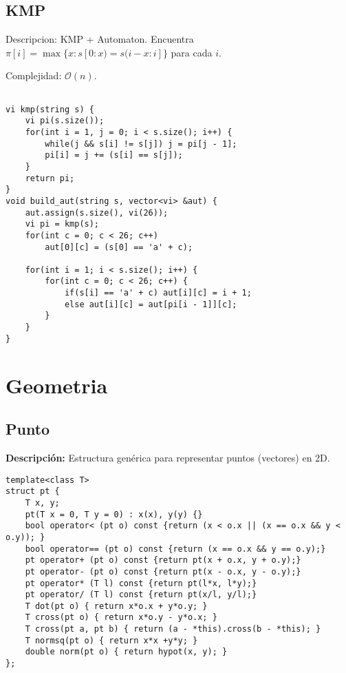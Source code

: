\documentclass[twocolumn]{article}
\begin{document}
\subsection{KMP}
\begin{footnotesize}Descripcion: KMP + Automaton. Encuentra $\pi[i] = \max \{x \colon s[0 : x) = s(i - x : i]\}$ para cada $i$.


Complejidad: $\mathcal{O}(n)$.
\end{footnotesize}\lstset{basicstyle=\footnotesize\ttfamily,breaklines=true,tabsize=2,language=C++,frame=leftline, numbers=left, numberstyle=\tiny, numbersep=5pt}
\begin{lstlisting}

vi kmp(string s) {
	vi pi(s.size());
	for(int i = 1, j = 0; i < s.size(); i++) {
		while(j && s[i] != s[j]) j = pi[j - 1];
		pi[i] = j += (s[i] == s[j]);
	}
	return pi;
}
void build_aut(string s, vector<vi> &aut) {
	aut.assign(s.size(), vi(26));
	vi pi = kmp(s);
	for(int c = 0; c < 26; c++)
		aut[0][c] = (s[0] == 'a' + c);

	for(int i = 1; i < s.size(); i++) {
		for(int c = 0; c < 26; c++) {
			if(s[i] == 'a' + c) aut[i][c] = i + 1;
			else aut[i][c] = aut[pi[i - 1]][c];
		}
	}
}

\end{lstlisting}
\section{Geometria}
\subsection{Punto}
\begin{footnotesize}{\bf Descripción: } Estructura genérica para representar puntos (vectores) en 2D.
\end{footnotesize}\lstset{basicstyle=\footnotesize\ttfamily,breaklines=true,tabsize=2,language=C++,frame=leftline, numbers=left, numberstyle=\tiny, numbersep=5pt}
\begin{lstlisting}
template<class T>
struct pt {
	T x, y;
	pt(T x = 0, T y = 0) : x(x), y(y) {}
	bool operator< (pt o) const {return (x < o.x || (x == o.x && y < o.y)); }
	bool operator== (pt o) const {return (x == o.x && y == o.y);}
	pt operator+ (pt o) const {return pt(x + o.x, y + o.y);}
	pt operator- (pt o) const {return pt(x - o.x, y - o.y);}
	pt operator* (T l) const {return pt(l*x, l*y);}
	pt operator/ (T l) const {return pt(x/l, y/l);}
	T dot(pt o) { return x*o.x + y*o.y; }
	T cross(pt o) { return x*o.y - y*o.x; }
	T cross(pt a, pt b) { return (a - *this).cross(b - *this); }
	T normsq(pt o) { return x*x +y*y; }
	double norm(pt o) { return hypot(x, y); }
};
\end{lstlisting}
\end{document}
